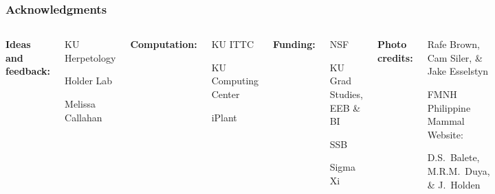 \begin{frame}
    \frametitle{Acknowledgments}
    \begin{columns}[c]
            {\bf Ideas and feedback:}
            \begin{myitemize}
                \item KU Herpetology
                \item Holder Lab
                \item Melissa Callahan
            \end{myitemize}
            \smallskip
            {\bf Computation:}
            \begin{myitemize}
                \item KU ITTC
                \item KU Computing Center
                \item iPlant
            \end{myitemize}
            {\bf Funding:}
            \begin{myitemize}
                \item NSF
                \item KU Grad Studies, EEB \& BI
                \item SSB
                \item Sigma Xi
            \end{myitemize}
            \smallskip
            {\bf Photo credits:}
            \begin{myitemize}
                \item Rafe Brown, Cam Siler, \& Jake Esselstyn
                \item FMNH Philippine Mammal Website:
                    \begin{myitemize}
                        \item D.S.\ Balete, M.R.M.\ Duya, \& J.\ Holden
                    \end{myitemize}
            \end{myitemize}
    \end{columns}
\end{frame}

